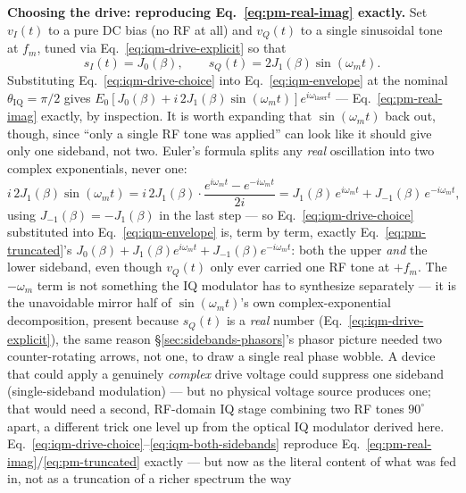 \documentclass[9pt]{article}
\begin{document}
\textbf{Choosing the drive: reproducing Eq.~\eqref{eq:pm-real-imag}
exactly.} Set $v_I(t)$ to a pure DC bias (no RF at all) and $v_Q(t)$ to a
single sinusoidal tone at $f_m$, tuned via Eq.~\eqref{eq:iqm-drive-explicit}
so that
\begin{equation}
s_I(t) = J_0(\beta), \qquad s_Q(t) = 2J_1(\beta)\sin(\omega_m t).
\label{eq:iqm-drive-choice}
\end{equation}
Substituting Eq.~\eqref{eq:iqm-drive-choice} into Eq.~\eqref{eq:iqm-envelope}
at the nominal $\theta_{\mathrm{IQ}}=\pi/2$ gives
$E_0[J_0(\beta) + i\,2J_1(\beta)\sin(\omega_m t)]e^{i\omega_{\mathrm{laser}}t}$
--- Eq.~\eqref{eq:pm-real-imag} exactly, by inspection. It is worth
expanding that $\sin(\omega_m t)$ back out, though, since ``only a single
RF tone was applied'' can look like it should give only one sideband, not
two. Euler's formula splits any \emph{real} oscillation into two complex
exponentials, never one:
\begin{equation}
i\,2J_1(\beta)\sin(\omega_m t) = i\,2J_1(\beta)\cdot\frac{e^{i\omega_m t}-e^{-i\omega_m t}}{2i}
= J_1(\beta)\,e^{i\omega_m t} + J_{-1}(\beta)\,e^{-i\omega_m t},
\label{eq:iqm-both-sidebands}
\end{equation}
using $J_{-1}(\beta)=-J_1(\beta)$ in the last step --- so
Eq.~\eqref{eq:iqm-drive-choice} substituted into Eq.~\eqref{eq:iqm-envelope}
is, term by term, exactly Eq.~\eqref{eq:pm-truncated}'s
$J_0(\beta)+J_1(\beta)e^{i\omega_m t}+J_{-1}(\beta)e^{-i\omega_m t}$: both the
upper \emph{and} the lower sideband, even though $v_Q(t)$ only ever carried
one RF tone at $+f_m$. The $-\omega_m$ term is not something the IQ
modulator has to synthesize separately --- it is the unavoidable mirror
half of $\sin(\omega_m t)$'s own complex-exponential decomposition, present
because $s_Q(t)$ is a \emph{real} number (Eq.~\eqref{eq:iqm-drive-explicit}), the same reason
\S\ref{sec:sidebands-phasors}'s phasor picture needed two
counter-rotating arrows, not one, to draw a single real phase wobble. A
device that could apply a genuinely \emph{complex} drive voltage could
suppress one sideband (single-sideband modulation) --- but no physical
voltage source produces one; that would need a second, RF-domain IQ stage
combining two RF tones $90^\circ$ apart, a different trick one level up
from the optical IQ modulator derived here.
Eq.~\eqref{eq:iqm-drive-choice}--\eqref{eq:iqm-both-sidebands} reproduce
Eq.~\eqref{eq:pm-real-imag}/\eqref{eq:pm-truncated} exactly --- but now as the literal
content of what was fed in, not as a truncation of a richer spectrum the way
\end{document}
